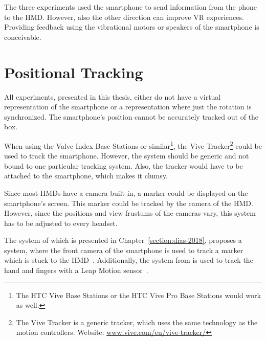 The three experiments used the smartphone to send information from the phone to the \ac{HMD}. However, also the other direction can improve \ac{VR} experiences. Providing feedback using the vibrational motors or speakers of the smartphone is conceivable.


\section{Positional Tracking}\label{section:fw-positional-tracking}

All experiments, presented in this thesis, either do not have a virtual representation of the smartphone or a representation where just the rotation is synchronized. The smartphone's position cannot be accurately tracked out of the box. 

When using the Valve Index Base Stations or similar\footnote{The HTC Vive Base Stations or the HTC Vive Pro Base Stations would work as well.}, the Vive Tracker\footnote{The Vive Tracker is a generic tracker, which uses the same technology as the motion controllers. Website: \href{https://www.vive.com/eu/vive-tracker/}{www.vive.com/eu/vive-tracker/}} could be used to track the smartphone. However, the system should be generic and not bound to one particular tracking system. Also, the tracker would have to be attached to the smartphone, which makes it clumsy.

Since most \acp{HMD} have a camera built-in, a marker could be displayed on the smartphone's screen. This marker could be tracked by the camera of the \ac{HMD}. However, since the positions and view frustums of the cameras vary, this system has to be adjusted to every headset.

The system of \citeauthor{Dias.2018} which is presented in Chapter~\ref{section:dias-2018}, proposes a system, where the front camera of the smartphone is used to track a marker which is stuck to the \ac{HMD}~\cite[4]{Dias.2018}. Additionally, the system from \citeauthor{Afonso.2017} is used to track the hand and fingers with a Leap Motion sensor~\cite[247]{Afonso.2017}.

